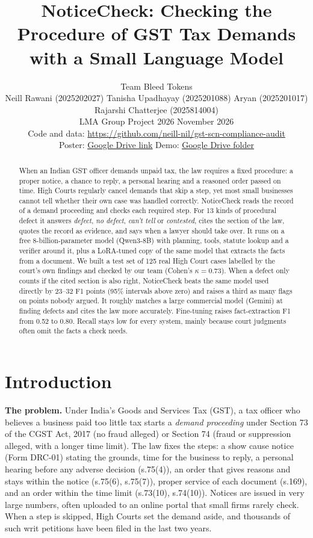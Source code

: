 \documentclass[10pt,a4paper]{article}
\title{\vspace{-8mm}NoticeCheck: Checking the Procedure of GST Tax Demands\\with a Small Language Model}
\author{Team Bleed Tokens\\[1pt]
\small Neill Rawani (2025202027) \quad Tanisha Upadhayay (2025201088) \quad Aryan (2025201017) \quad Rajarshi Chatterjee (2025814004)\\[1pt]
\small LMA Group Project 2026 \quad 15 November 2026\\[1pt]
\small Code and data: \url{https://github.com/neill-nil/gst-scn-compliance-audit}\\[1pt]
\small Poster: \href{https://drive.google.com/file/d/1UD2-qPk5pVgHLioTg9uEVj4NE_1hKugv/view?usp=sharing}{\underline{Google Drive link}} \quad Demo: \href{https://drive.google.com/drive/folders/1MQFtj3VcXVQ5wgm7d8KkxwWzBFvmmLw4?usp=sharing}{\underline{Google Drive folder}}}
\date{\vspace{-5mm}}
\begin{document}
\maketitle

\begin{abstract}
\noindent When an Indian GST officer demands unpaid tax, the law requires a fixed procedure: a proper notice, a chance to reply, a personal hearing and a reasoned order passed on time. High Courts regularly cancel demands that skip a step, yet most small businesses cannot tell whether their own case was handled correctly. NoticeCheck reads the record of a demand proceeding and checks each required step. For 13 kinds of procedural defect it answers \emph{defect}, \emph{no defect}, \emph{can't tell} or \emph{contested}, cites the section of the law, quotes the record as evidence, and says when a lawyer should take over. It runs on a free 8-billion-parameter model (Qwen3-8B) with planning, tools, statute lookup and a verifier around it, plus a LoRA-tuned copy of the same model that extracts the facts from a document. We built a test set of 125 real High Court cases labelled by the court's own findings and checked by our team (Cohen's $\kappa = 0.73$). When a defect only counts if the cited section is also right, NoticeCheck beats the same model used directly by 23--32 F1 points (95\% intervals above zero) and raises a third as many flags on points nobody argued. It roughly matches a large commercial model (Gemini) at finding defects and cites the law more accurately. Fine-tuning raises fact-extraction F1 from 0.52 to 0.80. Recall stays low for every system, mainly because court judgments often omit the facts a check needs.
\end{abstract}

\section{Introduction}

\textbf{The problem.} Under India's Goods and Services Tax (GST), a tax officer who believes a business paid too little tax starts a \emph{demand proceeding} under Section 73 of the CGST Act, 2017 \cite{cgst} (no fraud alleged) or Section 74 (fraud or suppression alleged, with a longer time limit). The law fixes the steps: a show cause notice (Form DRC-01) stating the grounds, time for the business to reply, a personal hearing before any adverse decision (s.75(4)), an order that gives reasons and stays within the notice (s.75(6), s.75(7)), proper service of each document (s.169), and an order within the time limit (s.73(10), s.74(10)). Notices are issued in very large numbers, often uploaded to an online portal that small firms rarely check. When a step is skipped, High Courts set the demand aside, and thousands of such writ petitions have been filed in the last two years.
\end{document}
